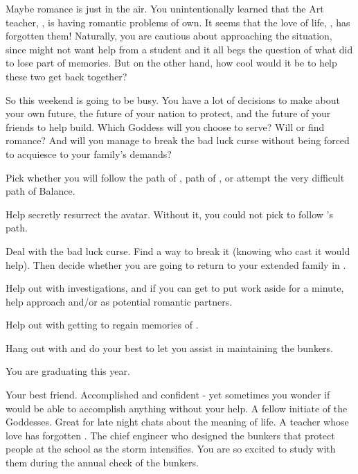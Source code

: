 \documentclass[char]{GL2020}
\begin{document}
Maybe romance is just in the air. You unintentionally learned that the Art teacher, \cChupAvenger{}, is having romantic problems of \cChupAvenger{\their} own. It seems that the love of \cChupAvenger{\their} life, \cHeadScientist{}, has forgotten them! Naturally, you are cautious about approaching the situation, since \cChupAvenger{} might not want help from a student and it all begs the question of what \cHeadScientist{} did to lose part of \cHeadScientist{\their} memories. But on the other hand, how cool would it be to help these two get back together?

So this weekend is going to be busy. You have a lot of decisions to make about your own future, the future of your nation to protect, and the future of your friends to help build. Which Goddess will you choose to serve? Will \cPresident{} or \cChupAvenger{} find romance? And will you manage to break the bad luck curse without being forced to acquiesce to your \pFarm{} family's demands?

\begin{itemz}[Goals]
	\item Pick whether you will follow the path of \cEbb{\full}, path of \cFlow{\full}, or attempt the very difficult path of Balance.
	\item Help secretly resurrect the \cEbb{} avatar. Without it, you could not pick to follow \cEbb{}'s path.
	\item Deal with the bad luck curse. Find a way to break it (knowing who cast it would help). Then decide whether you are going to return to your extended family in \pFarm{}.
	\item Help \cPresident{} out with \cPresident{\their} investigations, and if you can get \cPresident{\them} to put work aside for a minute, help \cPresident{\them} approach \cHeir{} and/or \cChupStudent{} as potential romantic partners.
	\item Help \cChupAvenger{} out with getting \cHeadScientist{} to regain \cHeadScientist{\their} memories of \cChupAvenger{}.
	\item Hang out with \cBunker{} and do your best to let you assist \cBunker{\them} in maintaining the bunkers.
\end{itemz}

\begin{itemz}[Notes]
	\item You are graduating this year.
\end{itemz}

\begin{contacts}
	\contact{\cPresident{}} Your best friend. Accomplished and confident - yet sometimes you wonder if \cPresident{\they} would be able to accomplish anything without your help.
	\contact{\cWarlordDaughter{}} A fellow initiate of the Goddesses. Great for late night chats about the meaning of life.
	\contact{\cChupAvenger{}} A teacher whose love has forgotten \cChupAvenger{\them}.
	\contact{\cBunker{}} The chief engineer who designed the bunkers that protect people at the school as the storm intensifies. You are so excited to study with them during the annual check of the bunkers.
\end{contacts}
\end{document}
